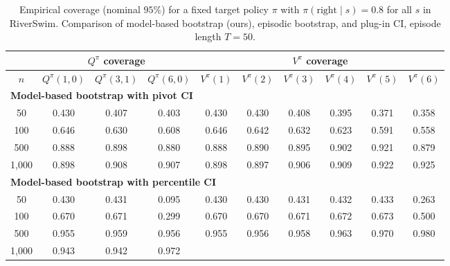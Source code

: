 \documentclass{article}
\numberwithin{equation}{section}
\begin{document}
\begin{table}[ht]
\centering
\caption{Empirical coverage (nominal $95\%$) for a fixed target policy $\pi$ with $\pi(\text{right}\mid s)=0.8$ for all $s$ in RiverSwim. Comparison of model-based bootstrap (ours), episodic bootstrap, and plug-in CI, episode length $T=50$.}
\label{tab:riverswim-mostly-right-coverage}
\begin{tabular}{c|ccc|cccccc}
\hline
& \multicolumn{3}{c|}{$Q^\pi$ coverage} & \multicolumn{6}{c}{$V^\pi$ coverage} \\ \hline
$n$
& $Q^\pi(1,0)$ & $Q^\pi(3,1)$ & $Q^\pi(6,0)$
& $V^\pi(1)$ & $V^\pi(2)$ & $V^\pi(3)$ & $V^\pi(4)$ & $V^\pi(5)$ & $V^\pi(6)$ \\
\hline
\multicolumn{10}{l}{\textbf{Model-based bootstrap with pivot CI}} \\ \hline
50
& 0.430 & 0.407 & 0.403
& 0.430 & 0.430 & 0.408 & 0.395 & 0.371 & 0.358 \\
100
& 0.646 & 0.630 & 0.608
& 0.646 & 0.642 & 0.632 & 0.623 & 0.591 & 0.558 \\
500
& \cellcolor{covheat!69!white}0.888 & \cellcolor{covheat!74!white}0.898 & \cellcolor{covheat!65!white}0.880
& \cellcolor{covheat!69!white}0.888 & \cellcolor{covheat!70!white}0.890 & \cellcolor{covheat!73!white}0.895 & \cellcolor{covheat!76!white}0.902 & \cellcolor{covheat!86!white}0.921 & \cellcolor{covheat!65!white}0.879 \\
1{,}000
& \cellcolor{covheat!74!white}0.898 & \cellcolor{covheat!79!white}0.908 & \cellcolor{covheat!79!white}0.907
& \cellcolor{covheat!74!white}0.898 & \cellcolor{covheat!74!white}0.897 & \cellcolor{covheat!78!white}0.906 & \cellcolor{covheat!80!white}0.909 & \cellcolor{covheat!86!white}0.922 & \cellcolor{covheat!88!white}0.925 \\
\hline
\multicolumn{10}{l}{\textbf{Model-based bootstrap with percentile CI}} \\ \hline
50
& 0.430 & 0.431 & 0.095
& 0.430 & 0.430 & 0.431 & 0.432 & 0.433 & 0.263 \\
100
& 0.670 & 0.671 & 0.299
& 0.670 & 0.670 & 0.671 & 0.672 & 0.673 & 0.500 \\
500
& \cellcolor{covheat!100!white}0.955 & \cellcolor{covheat!100!white}0.959 & \cellcolor{covheat!100!white}0.956
& \cellcolor{covheat!100!white}0.955 & \cellcolor{covheat!100!white}0.956 & \cellcolor{covheat!100!white}0.958 & \cellcolor{covheat!100!white}0.963 & \cellcolor{covheat!100!white}0.970 & \cellcolor{covheat!100!white}0.980 \\
1{,}000
& \cellcolor{covheat!96!white}0.943 & \cellcolor{covheat!96!white}0.942 & \cellcolor{covheat!100!white}0.972

\end{tabular}
\end{table}
\end{document}
